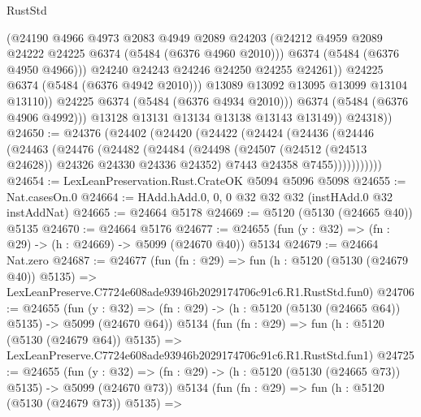 \begin{lexlean}{RustStd}
\begin{coremodule}
                          (@24190
                            @4966
                            @4973
                            @2083
                            @4949
                            @2089
                            @24203
                            (@24212 @4959 @2089 @24222 @24225 @6374 (@5484 (@6376 @4960 @2010)))
                            @6374
                            (@5484 (@6376 @4950 @4966)))
                          @24240
                          @24243
                          @24246
                          @24250
                          @24255
                          @24261))
                      @24225
                      @6374
                      (@5484 (@6376 @4942 @2010)))
                    @13089
                    @13092
                    @13095
                    @13099
                    @13104
                    @13110))
                @24225
                @6374
                (@5484 (@6376 @4934 @2010)))
              @6374
              (@5484 (@6376 @4906 @4992)))
            @13128
            @13131
            @13134
            @13138
            @13143
            @13149))
        @24318))
@24650 := @24376
    (@24402
      (@24420
        (@24422
          (@24424
            (@24436
              (@24446
                (@24463
                  (@24476
                    (@24482
                      (@24484
                        (@24498
                          (@24507 (@24512 (@24513 @24628)) @24326 @24330 @24336 @24352)
                          @7443
                          @24358
                          @7455)))))))))))
@24654 := LexLeanPreservation.Rust.CrateOK @5094 @5096 @5098
@24655 := Nat.casesOn.{0}
@24664 := HAdd.hAdd.{0, 0, 0} @32 @32 @32 (instHAdd.{0} @32 instAddNat)
@24665 := @24664 @5178
@24669 := @5120 (@5130 (@24665 @40)) @5135
@24670 := @24664 @5176
@24677 := @24655 (fun (y : @32) => (fn : @29) -> (h : @24669) -> @5099 (@24670 @40)) @5134
@24679 := @24664 Nat.zero
@24687 := @24677
    (fun (fn : @29) =>
    fun (h : @5120 (@5130 (@24679 @40)) @5135) =>
    LexLeanPreserve.C7724e608ade93946b2029174706c91c6.R1.RustStd.fun0)
@24706 := @24655
    (fun (y : @32) => (fn : @29) -> (h : @5120 (@5130 (@24665 @64)) @5135) -> @5099 (@24670 @64))
    @5134
    (fun (fn : @29) =>
    fun (h : @5120 (@5130 (@24679 @64)) @5135) =>
    LexLeanPreserve.C7724e608ade93946b2029174706c91c6.R1.RustStd.fun1)
@24725 := @24655
    (fun (y : @32) => (fn : @29) -> (h : @5120 (@5130 (@24665 @73)) @5135) -> @5099 (@24670 @73))
    @5134
    (fun (fn : @29) =>
    fun (h : @5120 (@5130 (@24679 @73)) @5135) =>

\end{coremodule}
\end{lexlean}
